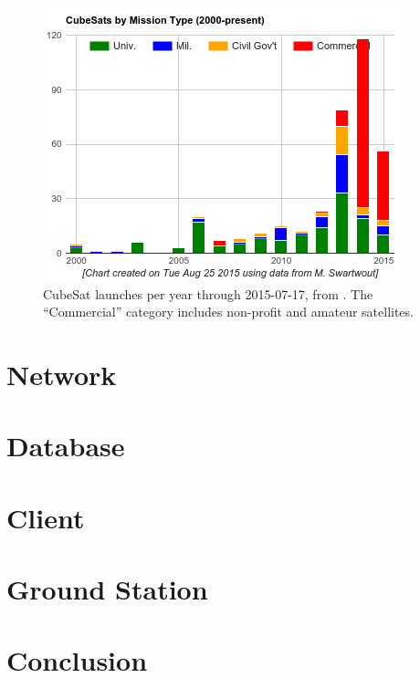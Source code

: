 \documentclass[conference]{IEEEtran}
\begin{document}
\begin{figure}[htbp]
\centering
\includegraphics[width=\columnwidth]{fig/cubesat-launches}
\caption{CubeSat launches per year through 2015-07-17, from \cite{SwartwoutDatabase}.  The ``Commercial'' category includes non-profit and amateur satellites.}
\label{f:launches}
\end{figure}


\section{Network}

\section{Database}

\section{Client}

\section{Ground Station}

\section{Conclusion}


\end{document}
